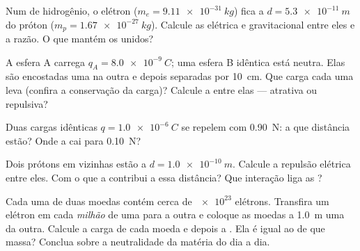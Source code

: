 \begin{exercise}[$\star\star$]\label{exo:g11:fundamental-interactions:7}
Num  de hidrogênio, o elétron ($m_e = \qty{9.11e-31}{kg}$) fica a
$d = \qty{5.3e-11}{m}$ do próton ($m_p = \qty{1.67e-27}{kg}$). Calcule as
 elétrica e gravitacional entre eles e a razão. O que mantém os
 unidos?
\end{exercise}

\begin{exercise}[$\star\star$]\label{exo:g11:fundamental-interactions:8}
A esfera A carrega $q_A = \qty{+8.0e-9}{C}$; uma esfera B idêntica está
neutra. Elas são encostadas uma na outra e depois separadas por
\qty{10}{cm}. Que carga cada uma leva (confira a conservação da carga)?
Calcule a  entre elas --- atrativa ou repulsiva?
\end{exercise}

\begin{exercise}[$\star\star$]\label{exo:g11:fundamental-interactions:9}
Duas cargas idênticas $q = \qty{1.0e-6}{C}$ se repelem com \qty{0.90}{N}:
a que distância estão? Onde a  cai para \qty{0.10}{N}?
\end{exercise}

\begin{exercise}[$\star\star$]\label{exo:g11:fundamental-interactions:10}
Dois prótons em  vizinhas estão a $d = \qty{1.0e-10}{m}$.
Calcule a repulsão elétrica entre eles. Com o que a 
contribui a essa distância? Que interação liga as ?
\end{exercise}

\begin{exercise}[$\star\star$]\label{exo:g11:fundamental-interactions:11}
Cada uma de duas moedas contém cerca de $\num{e23}$ elétrons. Transfira
um elétron em cada \emph{milhão} de uma para a outra e coloque as moedas
a \qty{1.0}{m} uma da outra. Calcule a carga de cada moeda e depois a
. Ela é igual ao  de que massa? Conclua sobre a neutralidade da
matéria do dia a dia.
\end{exercise}


